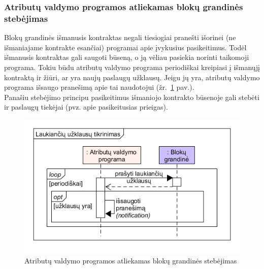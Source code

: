 \subsubsection{Atributų valdymo programos atliekamas blokų grandinės stebėjimas} \label{BCIDM:blockchainMonitoring}

Blokų grandinės išmanusis kontraktas negali tiesiogiai pranešti išorinei (ne išmaniajame kontrakte esančiai) programai
apie įvykusius pasikeitimus. Todėl išmanusis kontraktas gali saugoti būseną, o ją vėliau pasiekia norinti taikomoji programa.
Tokiu būdu atributų valdymo programa periodiškai kreipiasi į išmanųjį kontraktą ir žiūri, ar yra naujų paslaugų užklausų. Jeigu jų yra,
atributų valdymo programa išsaugo pranešimą apie tai naudotojui (žr.\hypertarget{fig:checkForPendingPermissions}{~\ref{fig:checkForPendingPermissions} pav.}).\\
Panašiu stebėjimo principu pasikeitimus išmaniojo kontrakto būsenoje gali stebėti ir paslaugų tiekėjai
(pvz. apie pasikeitusias prieigas).

\begin{figure}[h]
    \centering
    \includegraphics[scale=0.6]{img/checkForPendingPermissions}
    \caption{Atributų valdymo programos atliekamas blokų grandinės stebėjimas}
    \label{fig:checkForPendingPermissions}
\end{figure}